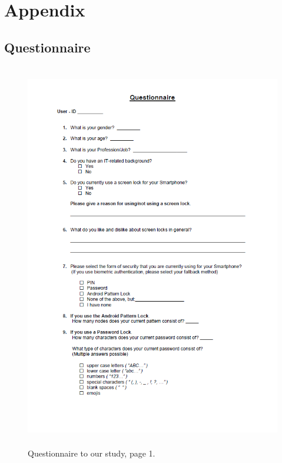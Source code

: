 

\chapter{Appendix}\label{ch:appendix} 

\section{Questionnaire}
\begin{figure}[H]
\includegraphics[width=13cm, height=17cm]{Chapters/graphics/survey1.PNG}
\caption{Questionnaire to our study, page 1.}
\label{fig:survey1}
\end{figure}

